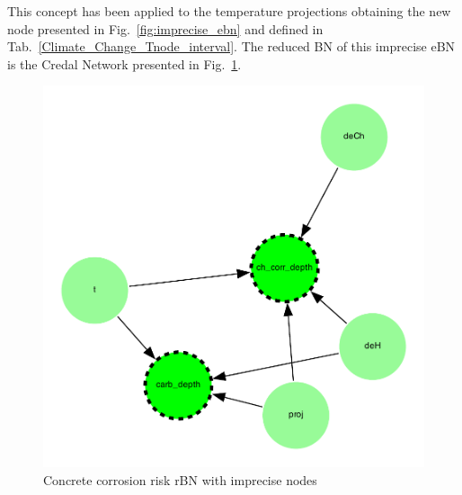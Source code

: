 This concept has been applied to the temperature projections obtaining the new node presented in Fig.~\ref{fig:imprecise_ebn} and defined in Tab.~\ref{Climate_Change_Tnode_interval}. The reduced BN of this imprecise eBN is the Credal Network presented in Fig.~\ref{fig:imprecise_rbn}.
\begin{figure}[H]
    \centering
    \includegraphics[scale=0.5]{imgs/pdfs/15_total_rbn_imprecise.pdf}
    \caption{Concrete corrosion risk rBN with imprecise nodes}\label{fig:imprecise_rbn}
\end{figure}